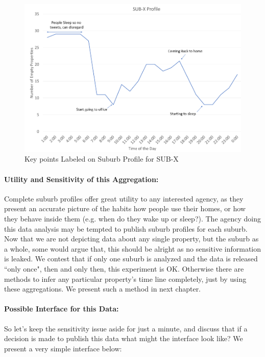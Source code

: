 \documentclass[12pt]{report}
\theoremstyle{named}
\begin{document}
\begin{figure}[ht]
\centering
        \includegraphics[width=150mm,scale=1]{Images/SubXProfileLabeled.png}
    \caption{Key points Labeled on Suburb Profile for SUB-X}
    \label{fig:SubXProfileLabeled}
\end{figure}



\paragraph{Utility and Sensitivity of this Aggregation:\\}
Complete suburb profiles offer great utility to any interested agency, as they present an accurate picture of the habits how people use their homes, or how they behave inside them (e.g. when do they wake up or sleep?). The agency doing this data analysis may be tempted to publish suburb profiles for each suburb. Now that we are not depicting data about any single property, but the suburb as a whole, some would argue that, this should be alright as no sensitive information is leaked. We contest that if only one suburb is analyzed and the data is released ``only once", then and only then, this experiment is OK. Otherwise there are methods to infer any particular property's time line completely, just by using these aggregations. We present such a method in next chapter. 

\paragraph{Possible Interface for this Data:\\}
So let's keep the sensitivity issue aside for just a minute, and discuss that if a decision is made to publish this data what might the interface look like? We present a very simple interface below:
\end{document}
